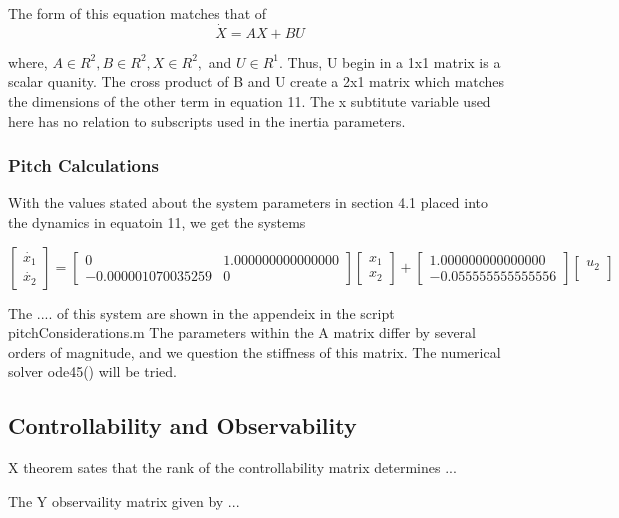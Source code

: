 \documentclass{article}
\begin{document}
The form of this equation matches that of
\begin{equation}
  \dot{X} = A X + B U
\end{equation}

where, $A \in R^2,B \in R^2, X \in R^2,$ and $U \in R^1$.
Thus, U begin in a 1x1 matrix is a scalar quanity.
The cross product of B and U create a 2x1 matrix which matches the dimensions of the other term in equation 11.
The x subtitute variable used here has no relation to subscripts used in the inertia parameters.
\subsubsection{Pitch Calculations}
With the values stated about the system parameters in section 4.1 placed into the dynamics in equatoin 11, we get the systems

\begin{equation}
  \begin{bmatrix}
  \dot{x_1}  \\
  \dot{x_2}
\end{bmatrix}
  =
  \begin{bmatrix}
  0 & 1.000000000000000 \\
  -0.000001070035259 & 0
 \end{bmatrix}
  \begin{bmatrix}
  x_1  \\
  x_2
  \end{bmatrix}
  +
  \begin{bmatrix}
   1.000000000000000 \\
  -0.055555555555556
  \end{bmatrix}
  \begin{bmatrix}
  u_2 \\
  \end{bmatrix}

\end{equation}

The .... of this system are shown in the appendeix in the script pitchConsiderations.m
The parameters within the A matrix differ by several orders of magnitude, and we question the stiffness of this matrix.
The numerical solver ode45() will be tried.
\subsection{Controllability and Observability}
X theorem sates that the rank of the controllability matrix determines ...

The Y observaility matrix given by ...
\end{document}

